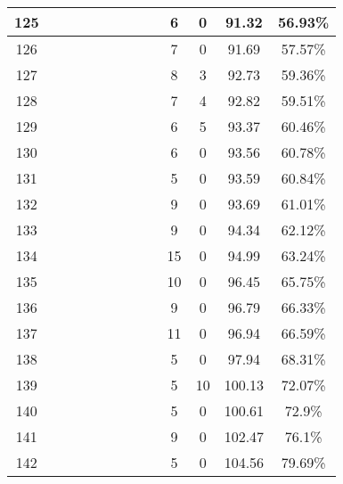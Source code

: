 \begin{longtable}{|c|c|c|c|c|c|c|c|c|c|c|c|c|}
125 &  \x    & \x    &       & \x    & \x    & \x    &       & \x    & 6 & 0 & 91.32 & 56.93\% \\ \hline
126 &  \x    & \x    &       & \x    &       &       &       & \x    & 7 & 0 & 91.69 & 57.57\% \\ \hline
127 &  \x    & \x    & \x    &       &       & \x\m  &       &       & 8 & 3 & 92.73 & 59.36\% \\ \hline
128 &  \x    & \x    &       & \x    &       &       & \x    &       & 7 & 4 & 92.82 & 59.51\% \\ \hline
129 &  \x    & \x    &       & \x    &       & \x    & \x    &       & 6 & 5 & 93.37 & 60.46\% \\ \hline
130 &  \x    & \x    &       & \x    &       &       & \x\m  &       & 6 & 0 & 93.56 & 60.78\% \\ \hline
131 &  \x    & \x    &       & \x    &       & \x    &       & \x    & 5 & 0 & 93.59 & 60.84\% \\ \hline
132 &  \x    & \x    &       & \x    &       &       &       &       & 9 & 0 & 93.69 & 61.01\% \\ \hline
133 &  \x    & \x    &       &       &       &       &       & \x    & 9 & 0 & 94.34 & 62.12\% \\ \hline
134 &  \x    & \x    &       &       &       &       &       &       & 15 & 0 & 94.99 & 63.24\% \\ \hline
135 &  \x    & \x    &       & \x    &       &       &       & \x\m  & 10 & 0 & 96.45 & 65.75\% \\ \hline
136 &  \x    & \x    &       &       &       & \x\m  &       &       & 9 & 0 & 96.79 & 66.33\% \\ \hline
137 &  \x    & \x    &       &       &       &       & \x\m  &       & 11 & 0 & 96.94 & 66.59\% \\ \hline
138 &  \x    & \x    &       &       &       & \x    &       &       & 5 & 0 & 97.94 & 68.31\% \\ \hline
139 &  \x    & \x    &       & \x    &       & \x\m  &       & \x\m  & 5 & 10 & 100.13 & 72.07\% \\ \hline
140 &  \x    & \x    &       & \x    &       & \x\m  & \x\m  &       & 5 & 0 & 100.61 & 72.9\% \\ \hline
141 &  \x    & \x    &       &       &       & \x\m  & \x\m  &       & 9 & 0 & 102.47 & 76.1\% \\ \hline
142 &  \x    & \x    &       &       &       & \x    &       & \x    & 5 & 0 & 104.56 & 79.69\% \\ \hline
\end{longtable}
\normalsize